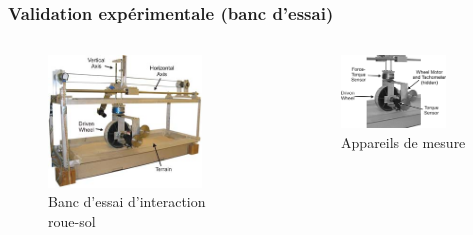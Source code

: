     \begin{frame}
        \frametitle{Validation expérimentale (banc d'essai)}
        \begin{columns}
            \begin{column}{0.5\textwidth}
                \vspace{-3mm}
                \begin{figure}
                    \includegraphics[width=0.8\textwidth]{./media/testBed.jpg}
                    \captionsetup{justification=centering}
                    \caption{Banc d'essai d'interaction roue-sol}
                \end{figure}
            \end{column}         
            
            \begin{column}{0.5\textwidth}
                \begin{figure}
                    \includegraphics[width=0.8\textwidth]{./media/testBedSensors.png}
                    \captionsetup{justification=centering}
                    \caption{Appareils de mesure}
                \end{figure}
            \end{column}
        \end{columns}        
    \end{frame}
    
